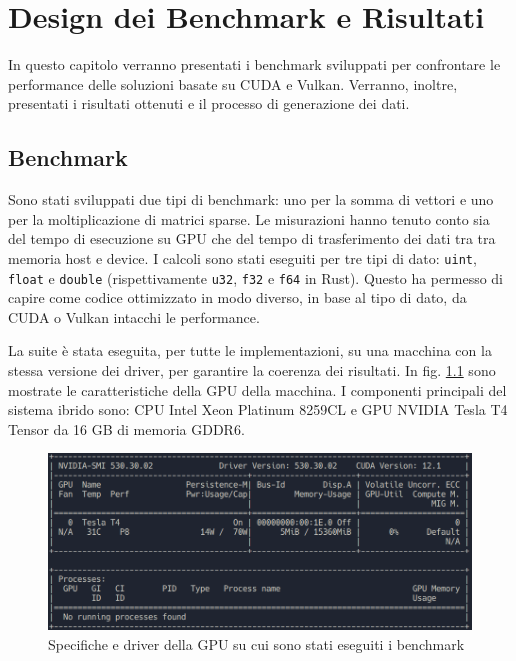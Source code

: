 \chapter{Design dei Benchmark e Risultati}
\label{sec:benchmark}

In questo capitolo verranno presentati i benchmark sviluppati per confrontare le performance delle soluzioni basate su CUDA e Vulkan. Verranno, inoltre, presentati i risultati ottenuti e il processo di generazione dei dati.

\section{Benchmark}

Sono stati sviluppati due tipi di benchmark: uno per la somma di vettori e uno per la moltiplicazione di matrici sparse. Le misurazioni hanno tenuto conto sia del tempo di esecuzione su GPU che del tempo di trasferimento dei dati tra tra memoria host e device. I calcoli sono stati eseguiti per tre tipi di dato: \verb|uint|, \verb|float| e \verb|double| (rispettivamente \verb|u32|, \verb|f32| e \verb|f64| in Rust). Questo ha permesso di capire come codice ottimizzato in modo diverso, in base al tipo di dato, da CUDA o Vulkan intacchi le performance. 

La suite è stata eseguita, per tutte le implementazioni, su una macchina con la stessa versione dei driver, per garantire la coerenza dei risultati. In fig. \ref{fig:macchina} sono mostrate le caratteristiche della GPU della macchina. I componenti principali del sistema ibrido sono: CPU Intel Xeon Platinum 8259CL e GPU NVIDIA Tesla T4 Tensor da 16 GB di memoria GDDR6.

\begin{figure}[ht]
    \centering
    \includegraphics[width=.9\linewidth]{images/chapter4/macchina.png}
    \caption{Specifiche e driver della GPU su cui sono stati eseguiti i benchmark}
    \label{fig:macchina}
\end{figure}

